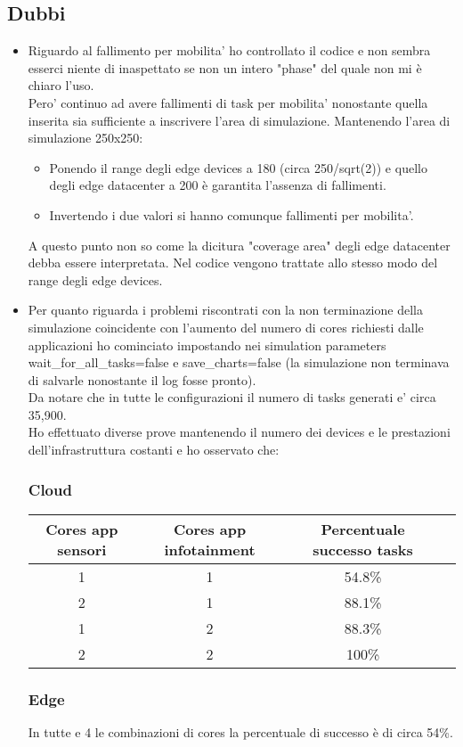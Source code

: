 \documentclass[12pt, a4paper]{report} %
\begin{document}
\subsection*{Dubbi}
\begin{itemize}
\item Riguardo al fallimento per mobilita' ho controllato il codice e non sembra esserci niente di inaspettato se non un intero "phase" del quale non mi è chiaro l'uso.\\
Pero' continuo ad avere fallimenti di task per mobilita' nonostante quella inserita sia sufficiente a inscrivere l'area di simulazione.
Mantenendo l'area di simulazione 250x250:
\begin{itemize}
	\item Ponendo il range degli edge devices a 180 (circa 250/sqrt(2)) e quello degli edge datacenter a 200 è garantita l'assenza di fallimenti.
	\item Invertendo i due valori si hanno comunque fallimenti per mobilita'.
\end{itemize}
A questo punto non so come la dicitura "coverage area" degli edge datacenter debba essere interpretata.
Nel codice vengono trattate allo stesso modo del range degli edge devices.
\item Per quanto riguarda i problemi riscontrati con la non terminazione della simulazione coincidente con l'aumento del numero di cores richiesti dalle applicazioni ho cominciato impostando nei simulation parameters wait\_for\_all\_tasks=false e save\_charts=false (la simulazione non terminava di salvarle nonostante il log fosse pronto).\\
Da notare che in tutte le configurazioni il numero di tasks generati e' circa 35,900.\\
Ho effettuato diverse prove mantenendo il numero dei devices e le prestazioni dell'infrastruttura costanti e ho osservato che:\\
\subsubsection*{Cloud}
\begin{tabular}{| c | c | c || c ||} %
		\hline
		Cores app sensori & Cores app infotainment & Percentuale successo tasks\\ [1ex] 
		\hline
		\hline
		1 & 1 & 54.8\%\\
		\hline
		2 & 1 & 88.1\%\\
		\hline
		1 & 2 & 88.3\%\\
		\hline
		2 & 2 & 100\%\\
		\hline
\end{tabular}


\subsubsection*{Edge}
In tutte e 4 le combinazioni di cores la percentuale di successo è di circa 54\%.
\end{itemize}
\end{document}
